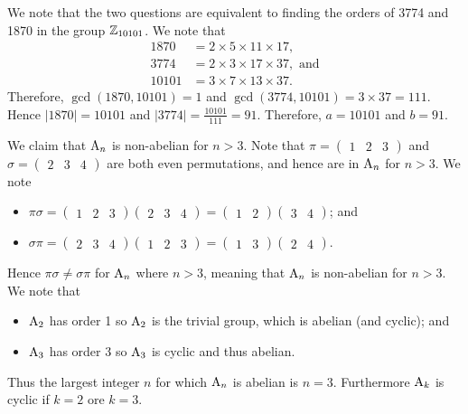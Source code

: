 \begin{questions}
    \item We note that the two questions are equivalent to finding the orders of 3774 and 1870 in the group $\mathbb{Z}_{10101}$. We note that
    \begin{align*}
        1870 &= 2 \times 5 \times 11 \times 17,\\
        3774 &= 2 \times 3 \times 17 \times 37, \text{ and}\\
        10101 &= 3 \times 7 \times 13 \times 37.
    \end{align*}
    Therefore, $\gcd(1870, 10101) = 1$ and $\gcd(3774, 10101) = 3 \times 37 = 111$. Hence $|1870| = 10101$ and $|3774| = \frac{10101}{111} = 91$. Therefore, $a = 10101$ and $b = 91$.

    \item We claim that $\mathrm{A}_{n}$ is non-abelian for $n > 3$. Note that $\pi = \begin{pmatrix}1 & 2 & 3\end{pmatrix}$ and $\sigma = \begin{pmatrix}2 & 3 & 4\end{pmatrix}$ are both even permutations, and hence are in $\mathrm{A}_{n}$ for $n > 3$. We note
    \begin{itemize}
        \item $\pi\sigma = \begin{pmatrix}1 & 2 & 3\end{pmatrix}\begin{pmatrix}2 & 3 & 4\end{pmatrix} = \begin{pmatrix}1 & 2\end{pmatrix}\begin{pmatrix}3 & 4\end{pmatrix}$; and
        \item $\sigma\pi = \begin{pmatrix}2 & 3 & 4\end{pmatrix}\begin{pmatrix}1 & 2 & 3\end{pmatrix} = \begin{pmatrix}1 & 3\end{pmatrix}\begin{pmatrix}2 & 4\end{pmatrix}$.
    \end{itemize}
    Hence $\pi\sigma \neq \sigma\pi$ for $\mathrm{A}_{n}$ where $n > 3$, meaning that $\mathrm{A}_{n}$ is non-abelian for $n > 3$. We note that
    \begin{itemize}
        \item $\mathrm{A}_{2}$ has order 1 so $\mathrm{A}_{2}$ is the trivial group, which is abelian (and cyclic); and
        \item $\mathrm{A}_{3}$ has order 3 so $\mathrm{A}_{3}$ is cyclic and thus abelian.
    \end{itemize}
    Thus the largest integer $n$ for which $\mathrm{A}_{n}$ is abelian is $n = 3$. Furthermore $\mathrm{A}_{k}$ is cyclic if $k = 2$ ore $k = 3$.


\end{questions}
